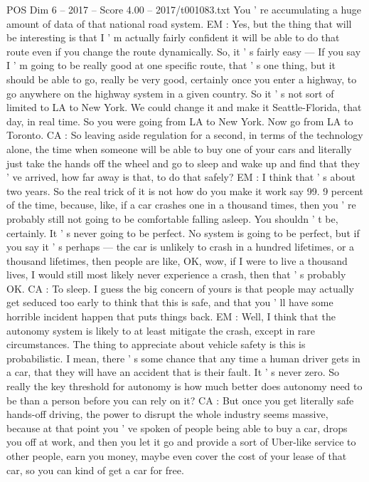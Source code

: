 \begin{textsample}{POS Dim 6 – 2017 – Score 4.00 – 2017/t001083.txt}
You ' re accumulating a huge amount of data of that national road system.
EM : Yes, but the thing that will be interesting is that I ' m actually fairly confident it will be able to do that route even if you change the route dynamically.
So, it ' s fairly easy — If you say I ' m going to be really good at one specific route, that ' s one thing, but it should be able to go, really be very good, certainly once you enter a highway, to go anywhere on the highway system in a given country.
So it ' s not sort of limited to LA to New York.
We could change it and make it Seattle-Florida, that day, in real time.
So you were going from LA to New York.
Now go from LA to Toronto.
CA : So leaving aside regulation for a second, in terms of the technology alone, the time when someone will be able to buy one of your cars and literally just take the hands off the wheel and go to sleep and wake up and find that they ' ve arrived, how far away is that, to do that safely?
EM : I think that ' s about two years.
So the real trick of it is not how do you make it work say 99. 9 percent of the time, because, like, if a car crashes one in a thousand times, then you ' re probably still not going to be comfortable falling asleep.
You shouldn ' t be, certainly.
It ' s never going to be perfect.
No system is going to be perfect, but if you say it ' s perhaps — the car is unlikely to crash in a hundred lifetimes, or a thousand lifetimes, then people are like, OK, wow, if I were to live a thousand lives, I would still most likely never experience a crash, then that ' s probably OK.
CA : To sleep.
I guess the big concern of yours is that people may actually get seduced too early to think that this is safe, and that you ' ll have some horrible incident happen that puts things back.
EM : Well, I think that the autonomy system is likely to at least mitigate the crash, except in rare circumstances.
The thing to appreciate about vehicle safety is this is probabilistic.
I mean, there ' s some chance that any time a human driver gets in a car, that they will have an accident that is their fault.
It ' s never zero.
So really the key threshold for autonomy is how much better does autonomy need to be than a person before you can rely on it?
CA : But once you get literally safe hands-off driving, the power to disrupt the whole industry seems massive, because at that point you ' ve spoken of people being able to buy a car, drops you off at work, and then you let it go and provide a sort of Uber-like service to other people, earn you money, maybe even cover the cost of your lease of that car, so you can kind of get a car for free.

\end{textsample}
